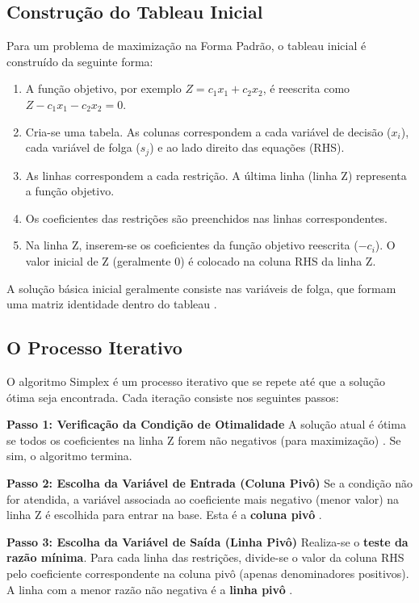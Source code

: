 \documentclass[conference]{IEEEtran}
\begin{document}
\subsection{Construção do Tableau Inicial}
Para um problema de maximização na Forma Padrão, o tableau inicial é construído da seguinte forma:
\begin{enumerate}
    \item A função objetivo, por exemplo $Z = c_1x_1 + c_2x_2$, é reescrita como $Z - c_1x_1 - c_2x_2 = 0$.
    \item Cria-se uma tabela. As colunas correspondem a cada variável de decisão ($x_i$), cada variável de folga ($s_j$) e ao lado direito das equações (RHS).
    \item As linhas correspondem a cada restrição. A última linha (linha Z) representa a função objetivo.
    \item Os coeficientes das restrições são preenchidos nas linhas correspondentes.
    \item Na linha Z, inserem-se os coeficientes da função objetivo reescrita ($-c_i$). O valor inicial de Z (geralmente 0) é colocado na coluna RHS da linha Z.
\end{enumerate}
A solução básica inicial geralmente consiste nas variáveis de folga, que formam uma matriz identidade dentro do tableau \cite{menezes}.

\subsection{O Processo Iterativo}
O algoritmo Simplex é um processo iterativo que se repete até que a solução ótima seja encontrada. Cada iteração consiste nos seguintes passos:

\textbf{Passo 1: Verificação da Condição de Otimalidade}
A solução atual é ótima se todos os coeficientes na linha Z forem não negativos (para maximização) \cite{menezes}. Se sim, o algoritmo termina.

\textbf{Passo 2: Escolha da Variável de Entrada (Coluna Pivô)}
Se a condição não for atendida, a variável associada ao coeficiente mais negativo (menor valor) na linha Z é escolhida para entrar na base. Esta é a \textbf{coluna pivô} \cite{menezes}.

\textbf{Passo 3: Escolha da Variável de Saída (Linha Pivô)}
Realiza-se o \textbf{teste da razão mínima}. Para cada linha das restrições, divide-se o valor da coluna RHS pelo coeficiente correspondente na coluna pivô (apenas denominadores positivos). A linha com a menor razão não negativa é a \textbf{linha pivô} \cite{menezes}.
\end{document}

